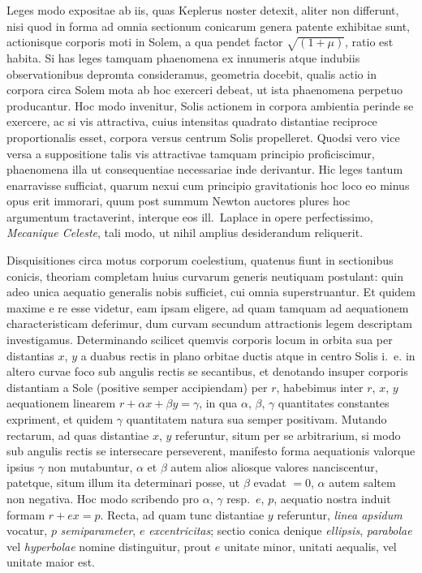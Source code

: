 \documentclass[12pt,a4paper]{book}
\begin{document}
Leges modo expositae ab iis, quas Keplerus noster detexit, aliter non differunt, nisi quod in forma ad omnia sectionum conicarum genera patente exhibitae sunt, actionisque corporis moti in Solem, a qua pendet factor $\sqrt{(1+\mu)}$, ratio est habita. Si has leges tamquam phaenomena ex innumeris atque indubiis observationibus depromta consideramus, geometria docebit, qualis actio in corpora circa Solem mota ab hoc exerceri debeat, ut ista phaenomena perpetuo producantur. Hoc modo invenitur, Solis actionem in corpora ambientia perinde se exercere, ac si vis attractiva, cuius intensitas quadrato distantiae reciproce proportionalis esset, corpora versus centrum Solis propelleret. Quodsi vero vice versa a suppositione talis vis attractivae tamquam principio proficiscimur, phaenomena illa ut consequentiae necessariae inde derivantur. Hic leges tantum enarravisse sufficiat, quarum nexui cum principio gravitationis hoc loco eo minus opus erit immorari, quum post summum Newton auctores plures hoc argumentum tractaverint, interque eos ill.~Laplace in opere perfectissimo, \textit{Mecanique Celeste}, tali modo, ut nihil amplius desiderandum reliquerit.

Disquisitiones circa motus corporum coelestium, quatenus fiunt in sectionibus conicis, theoriam completam huius curvarum generis neutiquam postulant: quin adeo unica aequatio generalis nobis sufficiet, cui omnia superstruantur. Et quidem maxime e re esse videtur, eam ipsam eligere, ad quam tamquam ad aequationem characteristicam deferimur, dum curvam secundum attractionis legem descriptam investigamus. Determinando scilicet quemvis corporis locum in orbita sua per distantias $x$, $y$ a duabus rectis in plano orbitae ductis atque in centro Solis i.~e. in altero curvae foco sub angulis rectis se secantibus, et denotando insuper corporis distantiam a Sole (positive semper accipiendam) per $r$, habebimus inter $r$, $x$, $y$ aequationem linearem $r+\alpha x+\beta y=\gamma$, in qua $\alpha$, $\beta$, $\gamma$ quantitates constantes expriment, et quidem $\gamma$ quantitatem natura sua semper positivam. Mutando rectarum, ad quas distantiae $x$, $y$ referuntur, situm per se arbitrarium, si modo sub angulis rectis se intersecare perseverent, manifesto forma aequationis valorque ipsius $\gamma$ non mutabuntur, $\alpha$ et $\beta$ autem alios aliosque valores nanciscentur, patetque, situm illum ita determinari posse, ut $\beta$ evadat $=0$, $\alpha$ autem saltem non negativa. Hoc modo scribendo pro $\alpha$, $\gamma$ resp.~$e$, $p$, aequatio nostra induit formam $r+ex=p$. Recta, ad quam tunc distantiae $y$ referuntur, \textit{linea apsidum} vocatur, $p$ \textit{semiparameter}, $e$ \textit{excentricitas}; sectio conica denique \textit{ellipsis}, \textit{parabolae} vel \textit{hyperbolae} nomine distinguitur, prout $e$ unitate minor, unitati aequalis, vel unitate maior est.
\end{document}
